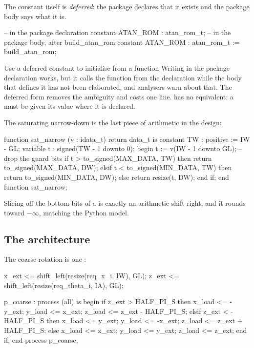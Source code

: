 The constant itself is \emph{deferred}: the package declares that it exists
and the package body says what it is.

\begin{vhdlcode}
-- in the package declaration
constant ATAN_ROM : atan_rom_t;
-- in the package body, after build_atan_rom
constant ATAN_ROM : atan_rom_t := build_atan_rom;
\end{vhdlcode}

\begin{tipbox}{Use a deferred constant to initialise from a function}
Writing  in the
package declaration works, but it calls the function from the declaration
while the body that defines it has not been elaborated, and analysers warn
about that. The deferred form removes the ambiguity and costs one line. \SV{} has no equivalent: a  must be given
its value where it is declared.
\end{tipbox}

The saturating narrow-down is the last piece of arithmetic in the design:

\begin{vhdlcode}
function sat_narrow (v : idata_t) return data_t is
  constant TW : positive := IW - GL;
  variable t  : signed(TW - 1 downto 0);
begin
  t := v(IW - 1 downto GL);          -- drop the guard bits
  if t > to_signed(MAX_DATA, TW) then
    return to_signed(MAX_DATA, DW);
  elsif t < to_signed(MIN_DATA, TW) then
    return to_signed(MIN_DATA, DW);
  else
    return resize(t, DW);
  end if;
end function sat_narrow;
\end{vhdlcode}

Slicing off the bottom  bits of a  is exactly an
arithmetic shift right, and it rounds toward $-\infty$, matching the Python
model.

\subsection{The architecture}

The coarse rotation is one :

\begin{vhdlcode}
x_ext <= shift_left(resize(req_x_i,     IW), GL);
z_ext <= shift_left(resize(req_theta_i, IA), GL);

p_coarse : process (all) is
begin
  if z_ext > HALF_PI_S then
    x_load <= -y_ext;  y_load <=  x_ext;
    z_load <=  z_ext - HALF_PI_S;
  elsif z_ext < -HALF_PI_S then
    x_load <=  y_ext;  y_load <= -x_ext;
    z_load <=  z_ext + HALF_PI_S;
  else
    x_load <= x_ext;   y_load <= y_ext;   z_load <= z_ext;
  end if;
end process p_coarse;
\end{vhdlcode}

